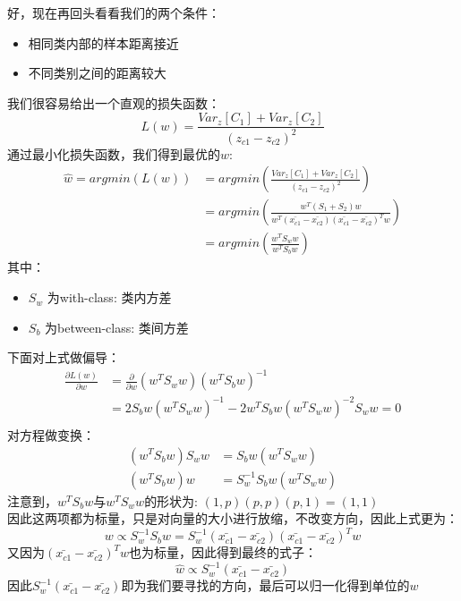 \documentclass{report}
\begin{document}
好，现在再回头看看我们的两个条件：
\begin{itemize}
	\item 相同类内部的样本距离接近
	\item 不同类别之间的距离较大
\end{itemize}
我们很容易给出一个直观的损失函数：
$$
L(w)=\frac{Var_z[C_1]+Var_z[C_2]}{(z_{c1}-z_{c2})^2}
$$
通过最小化损失函数，我们得到最优的$w$:
\begin{equation}
\begin{aligned}
\hat{w}=argmin(L(w))&=argmin(\frac{Var_z[C_1]+Var_z[C_2]}{(z_{c1}-z_{c2})^2})\\
&=argmin(\frac{w^T(S_1+S_2)w}{w^T(\bar{x_{c1}}-\bar{x_{c2}})(\bar{x_{c1}}-\bar{x_{c2}})^T w})\\
&=argmin(\frac{w^T S_w w}{w^T S_b w})
\end{aligned}
\end{equation}
其中：
\begin{itemize}
	\item $S_w$ 为with-class: 类内方差
	\item $S_b$ 为between-class: 类间方差
\end{itemize}
下面对上式做偏导：
$$
\begin{aligned}
\frac{\partial{L(w)}}{\partial{w}}&=\frac{\partial}{\partial{w}}(w^T S_w w)(w^T S_b w)^{-1}\\
&=2 S_{b} w\left(w^{T} S_{w} w\right)^{-1}-2 w^{T} S_{b} w\left(w^{T} S_{w} w\right)^{-2} S_{w} w=0\\
\end{aligned}
$$
对方程做变换：
$$
\begin{aligned}
\left(w^{T} S_{b} w\right) S_{w} w&=S_{b} w\left(w^{T} S_{w} w\right)\\
\left(w^{T} S_{b} w\right) w&=S_{w}^{-1}S_{b} w\left(w^{T} S_{w} w\right)
\end{aligned}
$$
注意到，$w^T S_b w$与$w^T S_w w$的形状为: $(1,p) (p,p) (p,1)=(1,1)$\\
因此这两项都为标量，只是对向量的大小进行放缩，不改变方向，因此上式更为：
$$
w \propto S_{w}^{-1} S_{b} w=S_{w}^{-1}\left(\bar{x_{c 1}}-\bar{x_{c 2}}\right)\left(\bar{x_{c 1}}-\bar{x_{c 2}}\right)^{T} w 
$$
又因为$\left(\bar{x_{c 1}}-\bar{x_{c 2}}\right)^{T} w$也为标量，因此得到最终的式子：
$$
\hat{w}\propto S_{w}^{-1}\left(\bar{x_{c 1}}-\bar{x_{c 2}}\right)
$$
因此$S_{w}^{-1}\left(\bar{x_{c 1}}-\bar{x_{c 2}}\right)$即为我们要寻找的方向，最后可以归一化得到单位的$w$
\newpage
\end{document}
